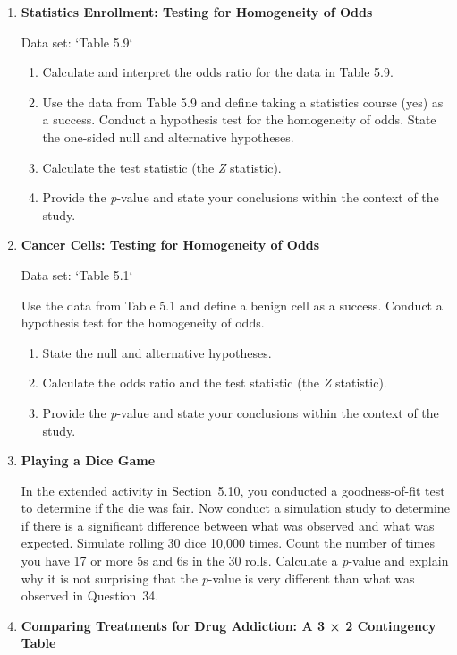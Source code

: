 \documentclass[
]{book}
\begin{document}
\begin{enumerate}
  \item \textbf{Statistics Enrollment: Testing for Homogeneity of Odds}    

  Data set: `Table 5.9`    
  
  \begin{enumerate}
    \item Calculate and interpret the odds ratio for the data in Table 5.9.
    \item Use the data from Table 5.9 and define taking a statistics course (yes) as a success. Conduct a hypothesis test for the homogeneity of odds. State the one-sided null and alternative hypotheses.
    \item Calculate the test statistic (the \textit{Z} statistic).
    \item Provide the \textit{p}-value and state your conclusions within the context of the study.
  \end{enumerate}

  \item \textbf{Cancer Cells: Testing for Homogeneity of Odds}    

  Data set: `Table 5.1`    
  
  Use the data from Table 5.1 and define a benign cell as a success. Conduct a hypothesis test for the homogeneity of odds.  
  \begin{enumerate}
    \item State the null and alternative hypotheses.
    \item Calculate the odds ratio and the test statistic (the \textit{Z} statistic).
    \item Provide the \textit{p}-value and state your conclusions within the context of the study.
  \end{enumerate}

  \item \textbf{Playing a Dice Game}    

  In the extended activity in Section 5.10, you conducted a goodness-of-fit test to determine if the die was fair. Now conduct a simulation study to determine if there is a significant difference between what was observed and what was expected. Simulate rolling 30 dice 10,000 times. Count the number of times you have 17 or more 5s and 6s in the 30 rolls. Calculate a \textit{p}-value and explain why it is not surprising that the \textit{p}-value is very different than what was observed in Question 34.

  \item \textbf{Comparing Treatments for Drug Addiction: A 3 × 2 Contingency Table}    


\end{enumerate}
\end{document}
